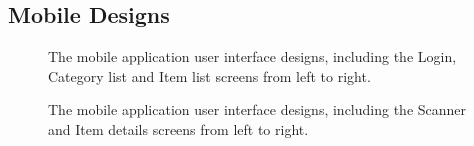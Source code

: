 \documentclass[a4paper,11pt]{report}
\begin{document}
\begin{appendix}
    \section{Mobile Designs}
    \label{appendix:mobileDesign}
        \begin{figure}[H]
            \centering
            \caption{The mobile application user interface designs, including the Login, Category list and Item list screens from left to right.}
            \label{fig:mobileUIpt1}
        \end{figure}
        \begin{figure}[H]
            \centering
            \caption{The mobile application user interface designs, including the Scanner and Item details screens from left to right.}
            \label{fig:mobileUIpt2}
        \end{figure}


\end{appendix}
\end{document}
